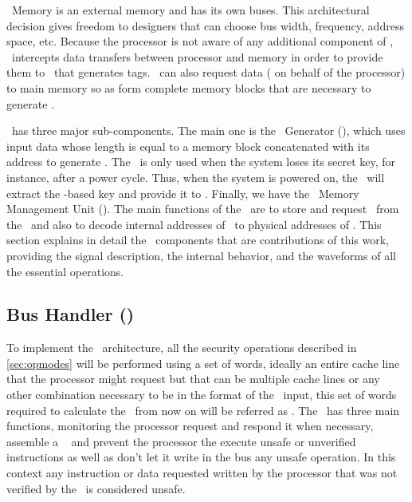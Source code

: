 \ptag~Memory is an external memory and has its own buses. This architectural decision gives freedom to designers that can choose bus width, frequency, address space, etc. Because the processor is not aware of any additional component of \cshia, \handler~intercepts data transfers between processor and memory in order to provide them to \seceng~that generates tags. \handler~can also request data ( on behalf of the processor) to main memory so as form complete memory blocks that are necessary to generate \ptags.

\seceng~has three major sub-components. The main one is the \ptag~Generator (\ptaggen), which uses input data whose length is equal to a memory block concatenated with its address to generate \ptags. The \fuzzy~is only used when the system loses its secret key, for instance, after a power cycle. Thus, when the system is powered on, the \fuzzy~will extract the \puf-based key and provide it to \ptaggen. Finally, we have the \ptag~Memory Management Unit (\pmmu). The main functions of the \pmmu~are to store and request \ptags~from the \ptagmem~and also to decode internal addresses of \ptags~to physical addresses of \ptagmem. This section explains in detail the \cshia~components that are contributions of this work, providing the signal description, the internal behavior, and the waveforms of all the essential operations.



\subsection{Bus Handler (\handler)}
\label{subsec:bushandler}
To implement the \cshia~architecture, all the security operations described in \ref{sec:opmodes} will be performed using a set of words, ideally an entire cache line that the processor might request but that can be multiple cache lines or any other combination necessary to be in the format of the \seceng~input, this set of words required to calculate the \ptags~from now on will be referred as \sline.  The \handler~has three main functions, monitoring the processor request and respond it when necessary, assemble a \sline~ and prevent the processor the execute unsafe or unverified instructions  as well as don't let  it  write in the bus any unsafe operation. In this context any instruction or data requested written by the processor that was not verified by the \seceng~is considered unsafe.



